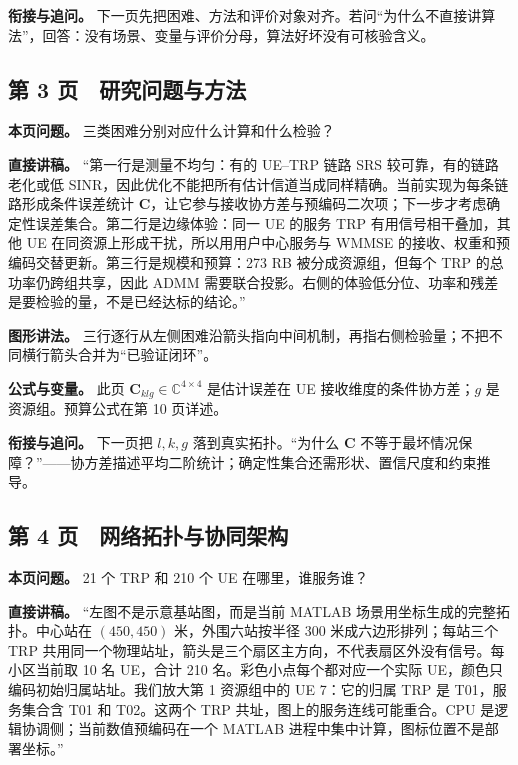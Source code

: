 \documentclass[11pt,a4paper]{ctexart}
\begin{document}
\textbf{衔接与追问。} 下一页先把困难、方法和评价对象对齐。若问“为什么不直接讲算法”，回答：没有场景、变量与评价分母，算法好坏没有可核验含义。\par

\subsection*{第 3 页　研究问题与方法}

\textbf{本页问题。} 三类困难分别对应什么计算和什么检验？\par

\textbf{直接讲稿。} “第一行是测量不均匀：有的 UE–TRP 链路 SRS 较可靠，有的链路老化或低 SINR，因此优化不能把所有估计信道当成同样精确。当前实现为每条链路形成条件误差统计 $\mathbf C$，让它参与接收协方差与预编码二次项；下一步才考虑确定性误差集合。第二行是边缘体验：同一 UE 的服务 TRP 有用信号相干叠加，其他 UE 在同资源上形成干扰，所以用用户中心服务与 WMMSE 的接收、权重和预编码交替更新。第三行是规模和预算：273 RB 被分成资源组，但每个 TRP 的总功率仍跨组共享，因此 ADMM 需要联合投影。右侧的体验低分位、功率和残差是要检验的量，不是已经达标的结论。”\par

\textbf{图形讲法。} 三行逐行从左侧困难沿箭头指向中间机制，再指右侧检验量；不把不同横行箭头合并为“已验证闭环”。\par

\textbf{公式与变量。} 此页 $\mathbf C_{klg}\in\mathbb C^{4\times4}$ 是估计误差在 UE 接收维度的条件协方差；$g$ 是资源组。预算公式在第 10 页详述。\par

\textbf{衔接与追问。} 下一页把 $l,k,g$ 落到真实拓扑。“为什么 $\mathbf C$ 不等于最坏情况保障？”——协方差描述平均二阶统计；确定性集合还需形状、置信尺度和约束推导。\par

\subsection*{第 4 页　网络拓扑与协同架构}

\textbf{本页问题。} 21 个 TRP 和 210 个 UE 在哪里，谁服务谁？\par

\textbf{直接讲稿。} “左图不是示意基站图，而是当前 MATLAB 场景用坐标生成的完整拓扑。中心站在 $(450,450)$ 米，外围六站按半径 300 米成六边形排列；每站三个 TRP 共用同一个物理站址，箭头是三个扇区主方向，不代表扇区外没有信号。每小区当前取 10 名 UE，合计 210 名。彩色小点每个都对应一个实际 UE，颜色只编码初始归属站址。我们放大第 1 资源组中的 UE 7：它的归属 TRP 是 T01，服务集合含 T01 和 T02。这两个 TRP 共址，图上的服务连线可能重合。CPU 是逻辑协调侧；当前数值预编码在一个 MATLAB 进程中集中计算，图标位置不是部署坐标。”\par
\end{document}

